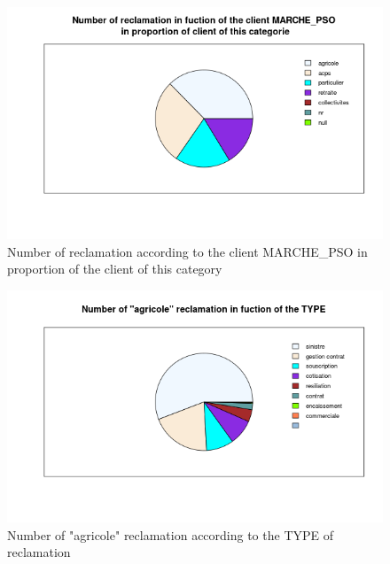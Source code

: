 \documentclass[a4paper, 11pt]{article}
\begin{document}
    \begin{figure}[!ht]
    	\centering
            \includegraphics[height = 10 cm]{Valentin/Number_of_reclamation_in_fuction_of_the_client_MARCHE_PSO_proportion.png}
            \caption{Number of reclamation according to the client MARCHE\_PSO in proportion of the client of this category}
            \label{fig:reclamtion_pso3}
    \end{figure}
    
    \begin{figure}[!ht]
    	\centering
            \includegraphics[height = 10 cm]{Valentin/Number_of_agricole_reclamation_in_fuction_of_the_TYPE.png}
            \caption{Number of "agricole" reclamation according to the TYPE of reclamation}
            \label{fig:reclamtion_agri}
    \end{figure}
    
\end{document}
